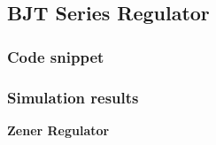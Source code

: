 \documentclass[12pt]{article}
\begin{document}
\subsection{BJT Series Regulator}
\subsubsection{Code snippet}

\subsubsection{Simulation results}
\textbf{\large Zener Regulator}
\begin{figure}[H]
  \begin{center}
\end{center}
\end{figure}
\begin{figure}[H]
  \begin{center}
\end{center}
\end{figure}
\begin{figure}[H]
  \begin{center}
\end{center}
\end{figure}
\end{document}
